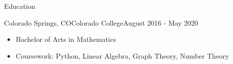 
\begin{cvsection}{Education}
	\begin{cvsubsection}{Colorado Springs, CO}{Colorado College}{August 2016 - May 2020}
		\begin{itemize}
			\item Bachelor of Arts in Mathematics

			\item Coursework: Python, Linear Algebra, Graph Theory, Number Theory
			
		\end{itemize}
	\end{cvsubsection}
\end{cvsection}
